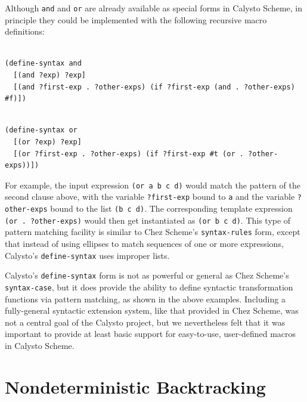 \documentclass[acmsmall,screen,authorversion]{acmart}
\begin{document}
\noindent
Although \texttt{and} and \texttt{or} are already available as special forms in
Calysto Scheme, in principle they could be implemented with the following
recursive macro definitions:\\

\begin{minipage}{\textwidth}
\begin{verbatim}

(define-syntax and
  [(and ?exp) ?exp]
  [(and ?first-exp . ?other-exps) (if ?first-exp (and . ?other-exps) #f)])

\end{verbatim}
\end{minipage}

\begin{minipage}{\textwidth}
\begin{verbatim}

(define-syntax or
  [(or ?exp) ?exp]
  [(or ?first-exp . ?other-exps) (if ?first-exp #t (or . ?other-exps))])

\end{verbatim}
\end{minipage}

\noindent
For example, the input expression \texttt{(or a b c d)} would match the pattern
of the second clause above, with the variable \texttt{?first-exp} bound to
\texttt{a} and the variable \texttt{?other-exps} bound to the list
\texttt{(b~c~d)}. The corresponding template expression
\texttt{(or~.~?other-exps)} would then get instantiated as \texttt{(or~b~c~d)}.
This type of pattern matching facility is similar to Chez Scheme's
\texttt{syntax-rules} form, except that instead of using ellipses to match
sequences of one or more expressions, Calysto's \texttt{define-syntax} uses
improper lists.

Calysto's \texttt{define-syntax} form is not as powerful or general as Chez
Scheme's \texttt{syntax-case}, but it does provide the ability to define
syntactic transformation functions via pattern matching, as shown in the above
examples.  Including a fully-general syntactic extension system, like that
provided in Chez Scheme, was not a central goal of the Calysto project, but we
nevertheless felt that it was important to provide at least basic support for
easy-to-use, user-defined macros in Calysto Scheme.

\section{Nondeterministic Backtracking}
\end{document}
